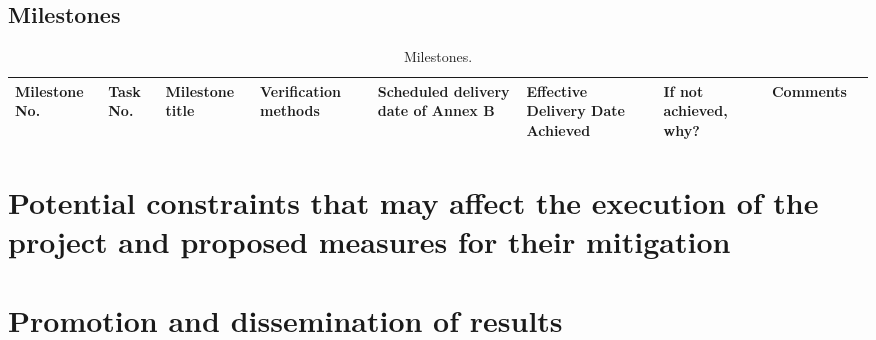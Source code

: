 \documentclass{ani-intermediate}
\begin{document}
  \newpage
  \subsection{Milestones}
  \lipsum[10-12]

  \begin{table}
    \center
    \scriptsize
    \begin{tabular}{|p{}|p{}|p{}|p{}|p{}|p{}|p{}|p{}|p{}|}
      \hline
      Milestone No. & Task No. & Milestone title & Verification methods & Scheduled delivery date of Annex B & Effective Delivery Date Achieved & If not achieved, why? & Comments \\ \hline
    \end{tabular}
    \caption{Milestones.}
  \end{table}
  \newpage

\section{Potential constraints that may affect the execution of the project and proposed measures for their mitigation}
\lipsum[13-20]

\section{Promotion and dissemination of results}
\lipsum[20-24]
\end{document}
